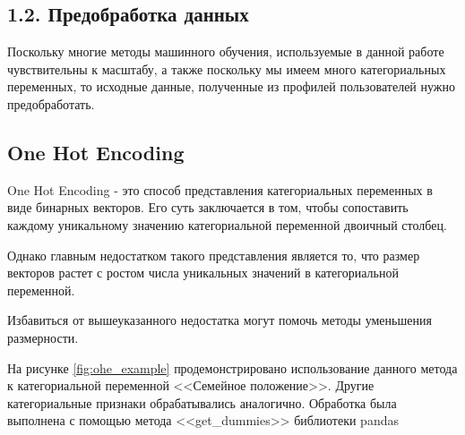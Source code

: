 \subsection{1.2. Предобработка данных}

Поскольку многие методы машинного обучения, используемые в данной работе чувствительны к масштабу, а также поскольку мы имеем много категориальных переменных, то исходные данные, полученные из профилей пользователей нужно предобработать.



\subsection*{One Hot Encoding}

One Hot Encoding - это способ представления категориальных переменных в виде бинарных векторов. Его суть заключается в том, чтобы сопоставить каждому уникальному значению категориальной переменной двоичный столбец. 

Однако главным недостатком такого представления является то, что размер векторов растет с ростом числа уникальных значений в категориальной переменной. 

Избавиться от вышеуказанного недостатка могут помочь методы уменьшения размерности.

На рисунке \ref{fig:ohe_example} продемонстрировано использование данного метода к категориальной переменной <<Семейное положение>>.  Другие категориальные признаки обрабатывались аналогично. Обработка была выполнена с помощью метода <<get\_dummies>> библиотеки pandas \cite{pandas} 

